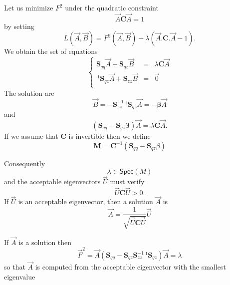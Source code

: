 \documentclass[aps]{revtex4}
\newcommand{\mymat}[1]{\boldsymbol{#1}}
\newcommand{\mytrn}[1]{~^{\mathsf{t}}\!{#1}}
\begin{document}
Let us minimize $F^2$ under the quadratic constraint
\begin{equation}
	\label{eq:C}
	\vec{A}\mymat{C}\vec{A} = 1
\end{equation}
by setting
\begin{equation}
	L\left(\vec{A},\vec{B}\right) = F^2\left(\vec{A},\vec{B}\right) - \lambda \left( \vec{A}.\mymat{C}.\vec{A} - 1\right).
\end{equation}
We obtain the set of equations
\begin{equation}
	\left\lbrace
	\begin{array}{rcl}
	\mymat{S}_{qq}\vec{A} + \mymat{S}_{qz}\vec{B} & = & \lambda \mymat{C} \vec{A} \\
	\mytrn{\mymat{S}}_{qz}\vec{A} + \mymat{S}_{zz}\vec{B} & = & \vec{0}\\
	\end{array}
	\right.
\end{equation}
The solution are
\begin{equation}
	\vec{B} = -\mymat{S}_{zz}^{-1} \mytrn{\mymat{S}}_{qz}\vec{A} = -\mymat{\beta}\vec{A}
\end{equation}
and
\begin{equation}
	\left(\mymat{S}_{qq} - \mymat{S}_{qz}\mymat{\beta}\right) \vec{A} = \lambda \mymat{C}\vec{A}.
\end{equation}
If we assume that $\mymat{C}$ is invertible then we define
\begin{equation}
	\mymat{M} = \mymat{C}^{-1} \left(\mymat{S}_{qq} - \mymat{S}_{qz}\beta\right)
\end{equation}

Consequently
\begin{equation}
	\lambda \in \mathsf{Spec}\left( M \right)
\end{equation}
and the acceptable eigenvectors $\vec{U}$ must verify
\begin{equation}
	\vec{U}\mymat{C}\vec{U}>0.
\end{equation}
If $\vec{U}$ is an acceptable eigenvector, then a solution $\vec{A}$ is 
\begin{equation}
	\vec{A} = \dfrac{1}{\sqrt{\vec{U}\mymat{C}\vec{U}}} \vec{U}
\end{equation}

If $\vec{A}$ is a solution then
\begin{equation}
	\vec{F}^2 = \vec{A} \left(\mymat{S}_{qq} - \mymat{S}_{qz}\mymat{S}_{zz}^{-1} \mytrn{\mymat{S}}_{qz}\right) \vec{A} = \lambda
\end{equation}
so that $\vec{A}$ is computed from the acceptable eigenvector with the smallest eigenvalue
\end{document}
